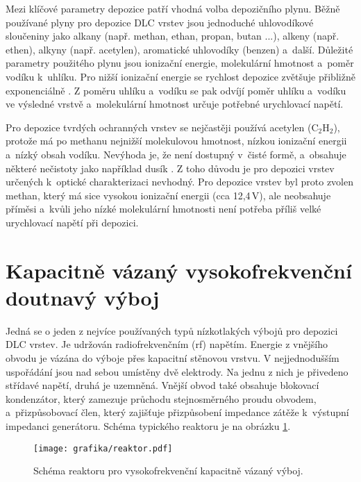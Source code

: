 Mezi klíčové parametry depozice patří vhodná volba depozičního plynu. Běžně používané plyny pro depozice DLC vrstev jsou jednoduché uhlovodíkové sloučeniny jako alkany (např. methan, ethan, propan, butan ...), alkeny (např. ethen), alkyny (např. acetylen), aromatické uhlovodíky (benzen) a~další. Důležité parametry použitého plynu jsou ionizační energie, molekulární hmotnost a~poměr vodíku k~uhlíku. Pro nižší ionizační energie se rychlost depozice zvětšuje přibližně exponenciálně \cite{Koidl1991}. Z poměru uhlíku a~vodíku se pak odvíjí poměr uhlíku a~vodíku ve výsledné vrstvě a~molekulární hmotnost určuje potřebné urychlovací napětí.

Pro depozice tvrdých ochranných vrstev se nejčastěji používá acetylen (C$_2$H$_2$), protože má po methanu nejnižší molekulovou hmotnost, nízkou ionizační energii a~nízký obsah vodíku. Nevýhoda je, že není dostupný v~čisté formě, a~obsahuje některé nečistoty jako například dusík \cite{Conway2000}. Z toho důvodu je pro depozici vrstev určených k~optické charakterizaci nevhodný. Pro depozice vrstev byl proto zvolen methan, který má sice vysokou ionizační energii (cca 12,4\,V), ale neobsahuje příměsi a~kvůli jeho nízké molekulární hmotnosti není potřeba příliš velké urychlovací napětí při depozici.

\section{Kapacitně vázaný vysokofrekvenční doutnavý výboj}
\label{ccp}

Jedná se o jeden z nejvíce používaných typů nízkotlakých výbojů pro depozici DLC vrstev. Je udržován radiofrekvenčním (rf) napětím. Energie z vnějšího obvodu je vázána do výboje přes kapacitní stěnovou vrstvu. V nejjednodušším uspořádání jsou nad sebou umístěny dvě elektrody. Na jednu z nich je přivedeno střídavé napětí, druhá je uzemněná. Vnější obvod také obsahuje blokovací kondenzátor, který zamezuje průchodu stejnosměrného proudu obvodem, a~přizpůsobovací člen, který zajišťuje přizpůsobení impedance zátěže k~výstupní impedanci generátoru. Schéma typického reaktoru je na obrázku \ref{reaktor-schema}. 

\begin{figure}[btp]
  \centering
  \texttt{[image: grafika/reaktor.pdf]}
  \caption{Schéma reaktoru pro vysokofrekvenční kapacitně vázaný výboj.}
  \label{reaktor-schema}
\end{figure}

